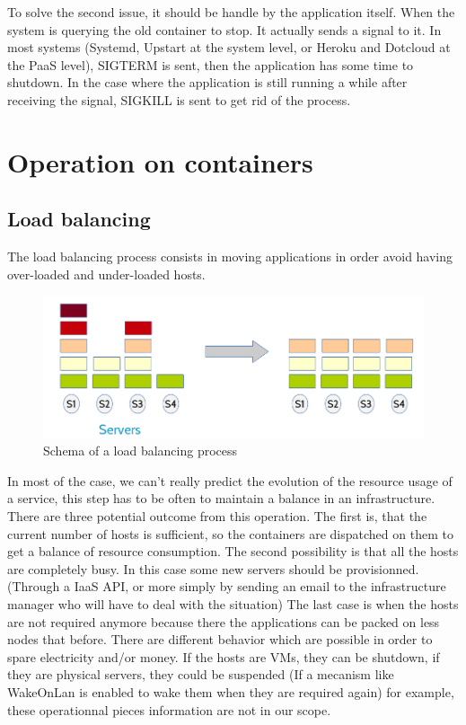 To solve the second issue, it should be handle by the application itself. When
the system is querying the old container to stop. It actually sends a signal to
it.  In most systems (Systemd, Upstart at the system level, or Heroku and
Dotcloud at the PaaS level), SIGTERM is sent, then the application has some
time to shutdown. In the case where the application is still running a while
after receiving the signal, SIGKILL is sent to get rid of the process.

\section{Operation on containers}

\subsection{Load balancing}

The load balancing process consists in moving applications in order avoid having
over-loaded and under-loaded hosts.

\begin{figure}[h!]
	\includegraphics[width=\textwidth]{./Images/loadbalancing.png}
	\caption{Schema of a load balancing process}
\end{figure}

In most of the case, we can't really predict the evolution of the resource usage
of a service, this step has to be often to maintain a balance in an
infrastructure.  There are three potential outcome from this operation. The
first is, that the current number of hosts is sufficient, so the containers are
dispatched on them to get a balance of resource consumption. The second
possibility is that all the hosts are completely busy. In this case some new
servers should be provisionned. (Through a IaaS API, or more simply by sending
an email to the infrastructure manager who will have to deal with the
situation) The last case is when the hosts are not required anymore because
there the applications can be packed on less nodes that before. There are
different behavior which are possible in order to spare electricity and/or
money. If the hosts are VMs, they can be shutdown, if they are physical
servers, they could be suspended (If a mecanism like WakeOnLan is enabled to
wake them when they are required again) for example, these operationnal pieces
information are not in our scope.


